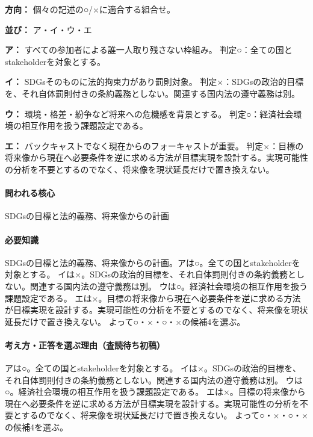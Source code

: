 \noindent\textbf{方向：} 個々の記述の○/×に適合する組合せ。\par

\noindent\textbf{並び：} ア・イ・ウ・エ\par

\noindent\textbf{ア：} すべての参加者による誰一人取り残さない枠組み。 判定○：全ての国とstakeholderを対象とする。\par

\noindent\textbf{イ：} SDGsそのものに法的拘束力があり罰則対象。 判定×：SDGsの政治的目標を、それ自体罰則付きの条約義務としない。関連する国内法の遵守義務は別。\par

\noindent\textbf{ウ：} 環境・格差・紛争など将来への危機感を背景とする。 判定○：経済社会環境の相互作用を扱う課題設定である。\par

\noindent\textbf{エ：} バックキャストでなく現在からのフォーキャストが重要。 判定×：目標の将来像から現在へ必要条件を逆に求める方法が目標実現を設計する。実現可能性の分析を不要とするのでなく、将来像を現状延長だけで置き換えない。\par

\paragraph{問われる核心} SDGsの目標と法的義務、将来像からの計画

\paragraph{必要知識} SDGsの目標と法的義務、将来像からの計画。アは○。全ての国とstakeholderを対象とする。 イは×。SDGsの政治的目標を、それ自体罰則付きの条約義務としない。関連する国内法の遵守義務は別。 ウは○。経済社会環境の相互作用を扱う課題設定である。 エは×。目標の将来像から現在へ必要条件を逆に求める方法が目標実現を設計する。実現可能性の分析を不要とするのでなく、将来像を現状延長だけで置き換えない。 よって○・×・○・×の候補4を選ぶ。

\paragraph{考え方・正答を選ぶ理由（査読待ち初稿）} アは○。全ての国とstakeholderを対象とする。 イは×。SDGsの政治的目標を、それ自体罰則付きの条約義務としない。関連する国内法の遵守義務は別。 ウは○。経済社会環境の相互作用を扱う課題設定である。 エは×。目標の将来像から現在へ必要条件を逆に求める方法が目標実現を設計する。実現可能性の分析を不要とするのでなく、将来像を現状延長だけで置き換えない。 よって○・×・○・×の候補4を選ぶ。

